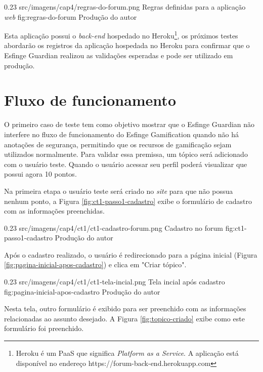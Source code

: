 \begin{image}
{0.23}
{src/imagens/cap4/regras-do-forum.png}
{Regras definidas para a aplicação \textit{web}}
{fig:regras-do-forum}
{Produção do autor}
\end{image}

\par Esta aplicação possui o \textit{back-end} hospedado no Heroku\footnote{Heroku é um PaaS que significa \textit{Platform as a Service}. A aplicação está disponível no endereço https://forum-back-end.herokuapp.com}, os próximos testes abordarão os registros da aplicação hospedada no Heroku para confirmar que o Esfinge Guardian realizou as validações esperadas e pode ser utilizado em produção.

\section{Fluxo de funcionamento}

\par O primeiro caso de teste tem como objetivo mostrar que o Esfinge Guardian não interfere no fluxo de funcionamento do Esfinge Gamification quando não há anotações de segurança, permitindo que os recursos de gamificação sejam utilizados normalmente. Para validar essa premissa, um tópico será adicionado com o usuário teste. Quando o usuário acessar seu perfil poderá visualizar que possui agora 10 pontos.

\par Na primeira etapa o usuário teste será criado no \textit{site} para que não possua nenhum ponto, a Figura \ref{fig:ct1-passo1-cadastro} exibe o formulário de cadastro com as informações preenchidas.

\begin{image}
{0.23}
{src/imagens/cap4/ct1/ct1-cadastro-forum.png}
{Cadastro no forum}
{fig:ct1-passo1-cadastro}
{Produção do autor}
\end{image}

\par Após o cadastro realizado, o usuário é redirecionado para a página inicial (Figura \ref{fig:pagina-inicial-apos-cadastro}) e clica em "Criar tópico".

\begin{image}
{0.23}
{src/imagens/cap4/ct1/ct1-tela-incial.png}
{Tela incial após cadastro}
{fig:pagina-inicial-apos-cadastro}
{Produção do autor}
\end{image}

\par Nesta tela, outro formulário é exibido para ser preenchido com as informações relacionadas ao assunto desejado. A Figura \ref{fig:topico-criado} exibe como este formulário foi preenchido.

